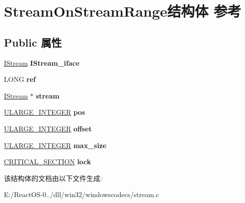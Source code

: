 \hypertarget{struct_stream_on_stream_range}{}\section{Stream\+On\+Stream\+Range结构体 参考}
\label{struct_stream_on_stream_range}
\subsection*{Public 属性}
\begin{DoxyCompactItemize}
\item 
\mbox{\label{struct_stream_on_stream_range_a04a6800ad2f97d822cc9f3f138d85eb5}} 
\hyperlink{interface_i_stream}{I\+Stream} {\bfseries I\+Stream\+\_\+iface}
\item 
\mbox{\label{struct_stream_on_stream_range_a817288e154a412d005c28e16f61f2bbd}} 
L\+O\+NG {\bfseries ref}
\item 
\mbox{\label{struct_stream_on_stream_range_ae68c4af4277c009a5bdb08eabcc2e9dc}} 
\hyperlink{interface_i_stream}{I\+Stream} $\ast$ {\bfseries stream}
\item 
\mbox{\label{struct_stream_on_stream_range_a5501cf0200ffd1d0b6fb99bd555560a0}} 
\hyperlink{struct___u_l_a_r_g_e___i_n_t_e_g_e_r}{U\+L\+A\+R\+G\+E\+\_\+\+I\+N\+T\+E\+G\+ER} {\bfseries pos}
\item 
\mbox{\label{struct_stream_on_stream_range_a1a5e7f87a3df0012c616834a88eb17d7}} 
\hyperlink{struct___u_l_a_r_g_e___i_n_t_e_g_e_r}{U\+L\+A\+R\+G\+E\+\_\+\+I\+N\+T\+E\+G\+ER} {\bfseries offset}
\item 
\mbox{\label{struct_stream_on_stream_range_ab13e9e2d92328a4ae19f8b105d2ff439}} 
\hyperlink{struct___u_l_a_r_g_e___i_n_t_e_g_e_r}{U\+L\+A\+R\+G\+E\+\_\+\+I\+N\+T\+E\+G\+ER} {\bfseries max\+\_\+size}
\item 
\mbox{\label{struct_stream_on_stream_range_a3ed60ec76e2fa710db1243becfcaf8b3}} 
\hyperlink{struct___c_r_i_t_i_c_a_l___s_e_c_t_i_o_n}{C\+R\+I\+T\+I\+C\+A\+L\+\_\+\+S\+E\+C\+T\+I\+ON} {\bfseries lock}
\end{DoxyCompactItemize}


该结构体的文档由以下文件生成\+:\begin{DoxyCompactItemize}
\item 
E\+:/\+React\+O\+S-\/0../dll/win32/windowscodecs/stream.\+c\end{DoxyCompactItemize}
